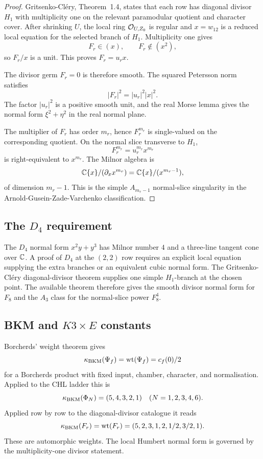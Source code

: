 \begin{proof}
Gritsenko-Cl\'ery, Theorem~1.4, states that each row has diagonal
divisor \(H_1\) with multiplicity one on the relevant paramodular
quotient and character cover.  After shrinking \(U\), the local ring
\(\mathcal{O}_{U,Z_0}\) is regular and \(x=w_{12}\) is a reduced local equation
for the selected branch of \(H_1\).  Multiplicity one gives
\[
  F_r\in (x),\qquad F_r\notin (x^2),
\]
so \(F_r/x\) is a unit.  This proves \(F_r=u_rx\).

The divisor germ \(F_r=0\) is therefore smooth.  The squared Petersson
norm satisfies
\[
  |F_r|^2=|u_r|^2|x|^2 .
\]
The factor \(|u_r|^2\) is a positive smooth unit, and the real Morse
lemma gives the normal form \(\xi^2+\eta^2\) in the real normal plane.

The multiplier of \(F_r\) has order \(m_r\), hence \(F_r^{m_r}\) is
single-valued on the corresponding quotient.  On the normal slice
transverse to \(H_1\),
\[
  F_r^{m_r}=u_r^{m_r}x^{m_r}
\]
is right-equivalent to \(x^{m_r}\).  The Milnor algebra is
\[
  \mathbb{C}\{x\}/(\partial_x x^{m_r})
  =
  \mathbb{C}\{x\}/(x^{m_r-1}),
\]
of dimension \(m_r-1\).  This is the simple \(A_{m_r-1}\) normal-slice
singularity in the Arnold-Gusein-Zade-Varchenko classification.
\end{proof}

\subsection*{The \(D_4\) requirement}

The \(D_4\) normal form \(x^2y+y^3\) has Milnor number \(4\) and a
three-line tangent cone over \(\mathbb{C}\).  A proof of \(D_4\) at the
\((2,2)\) row requires an explicit local equation supplying the extra
branches or an equivalent cubic normal form.  The Gritsenko-Cl\'ery
diagonal-divisor theorem supplies one simple \(H_1\)-branch at the
chosen point.  The available theorem therefore gives the smooth
divisor normal form for \(F_8\) and the \(A_3\) class for the
normal-slice power \(F_8^4\).

\subsection*{BKM and \(K3\times E\) constants}

Borcherds' weight theorem gives
\[
  \kappa_{\mathrm{BKM}}(\Psi_f)=\mathrm{wt}(\Psi_f)=c_f(0)/2
\]
for a Borcherds product with fixed input, chamber, character, and
normalisation.  Applied to the CHL ladder this is
\[
  \kappa_{\mathrm{BKM}}(\Phi_N)=(5,4,3,2,1)
  \quad(N=1,2,3,4,6).
\]
Applied row by row to the diagonal-divisor catalogue it reads
\[
  \kappa_{\mathrm{BKM}}(F_r)=\mathrm{wt}(F_r)
  =(5,2,3,1,2,1/2,3/2,1).
\]
These are automorphic weights.  The local Humbert normal form is
governed by the multiplicity-one divisor statement.

